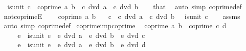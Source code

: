 \begin{isabellebody}
\ \ {\isachardoublequoteopen}is{\isacharunderscore}{\kern0pt}unit\ c{\isachardoublequoteclose}\ \ {\isachardoublequoteopen}coprime\ a\ b{\isachardoublequoteclose}\ \ {\isachardoublequoteopen}c\ dvd\ a{\isachardoublequoteclose}\ \ {\isachardoublequoteopen}c\ dvd\ b{\isachardoublequoteclose}\isanewline
%
\isadelimproof
\ \ %
\endisadelimproof
%
\isatagproof
{}\isamarkupfalse%
\ that\ \isamarkupfalse%
\ {\isacharparenleft}{\kern0pt}auto\ simp{\isacharcolon}{\kern0pt}\ coprime{\isacharunderscore}{\kern0pt}def{\isacharparenright}{\kern0pt}%
\endisatagproof
{\isafoldproof}%
%
\isadelimproof
\isanewline
%
\endisadelimproof
\isanewline
{}\isamarkupfalse%
\ not{\isacharunderscore}{\kern0pt}coprimeE{\isacharcolon}{\kern0pt}\isanewline
\ \ \ {\isachardoublequoteopen}{\isasymnot}\ coprime\ a\ b{\isachardoublequoteclose}\isanewline
\ \ \ c\ \ {\isachardoublequoteopen}c\ dvd\ a{\isachardoublequoteclose}\ \ {\isachardoublequoteopen}c\ dvd\ b{\isachardoublequoteclose}\ \ {\isachardoublequoteopen}{\isasymnot}\ is{\isacharunderscore}{\kern0pt}unit\ c{\isachardoublequoteclose}\isanewline
%
\isadelimproof
\ \ %
\endisadelimproof
%
\isatagproof
{}\isamarkupfalse%
\ assms\ \isamarkupfalse%
\ {\isacharparenleft}{\kern0pt}auto\ simp{\isacharcolon}{\kern0pt}\ coprime{\isacharunderscore}{\kern0pt}def{\isacharparenright}{\kern0pt}%
\endisatagproof
{\isafoldproof}%
%
\isadelimproof
\isanewline
%
\endisadelimproof
\isanewline
{}\isamarkupfalse%
\ coprime{\isacharunderscore}{\kern0pt}imp{\isacharunderscore}{\kern0pt}coprime{\isacharcolon}{\kern0pt}\isanewline
\ \ {\isachardoublequoteopen}coprime\ a\ b{\isachardoublequoteclose}\ \ {\isachardoublequoteopen}coprime\ c\ d{\isachardoublequoteclose}\isanewline
\ \ \ \ \ {\isachardoublequoteopen}{\isasymAnd}e{\isachardot}{\kern0pt}\ {\isasymnot}\ is{\isacharunderscore}{\kern0pt}unit\ e\ {\isasymLongrightarrow}\ e\ dvd\ a\ {\isasymLongrightarrow}\ e\ dvd\ b\ {\isasymLongrightarrow}\ e\ dvd\ c{\isachardoublequoteclose}\isanewline
\ \ \ \ \ {\isachardoublequoteopen}{\isasymAnd}e{\isachardot}{\kern0pt}\ {\isasymnot}\ is{\isacharunderscore}{\kern0pt}unit\ e\ {\isasymLongrightarrow}\ e\ dvd\ a\ {\isasymLongrightarrow}\ e\ dvd\ b\ {\isasymLongrightarrow}\ e\ dvd\ d{\isachardoublequoteclose}\isanewline
%
\isadelimproof
%
\endisadelimproof
%
\isatagproof
{}\isamarkupfalse%

\end{isabellebody}
